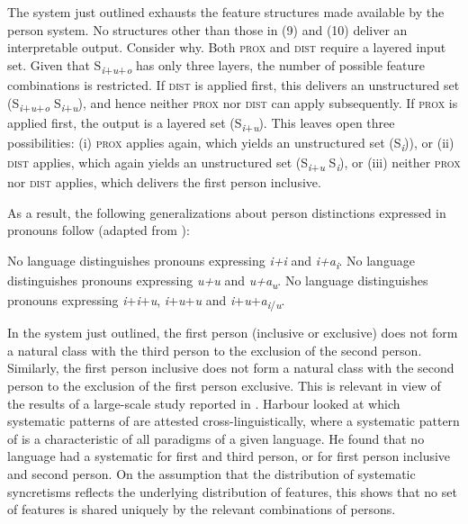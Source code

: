 \documentclass[output=paper]{langsci/langscibook}
\begin{document}
The system just outlined exhausts the feature structures made available by the person system. No structures other than those in (9) and (10) deliver an interpretable output. Consider why. Both \textsc{prox} and \textsc{dist} require a layered input set. Given that S\textit{\textsubscript{i}}\textsubscript{+}\textit{\textsubscript{u}}\textsubscript{+}\textit{\textsubscript{o}} has only three layers, the number of possible feature combinations is restricted. If \textsc{dist} is applied first, this delivers an unstructured set (S\textit{\textsubscript{i}}\textsubscript{+}\textit{\textsubscript{u}}\textsubscript{+}\textit{\textsubscript{o}} \textminus{} S\textit{\textsubscript{i}}\textsubscript{+}\textit{\textsubscript{u}}), and hence neither \textsc{prox} nor \textsc{dist} can apply subsequently. If \textsc{prox} is applied first, the output is a layered set (S\textit{\textsubscript{i}}\textsubscript{+}\textit{\textsubscript{u}}). This leaves open three possibilities: (i) \textsc{prox} applies again, which yields an unstructured set (S\textit{\textsubscript{i}})), or (ii) \textsc{dist} applies, which again yields an unstructured set (S\textit{\textsubscript{i}}\textsubscript{+}\textit{\textsubscript{u}} \textminus{} S\textit{\textsubscript{i}}), or (iii) neither \textsc{prox} nor \textsc{dist} applies, which delivers the first person inclusive.

As a result, the following generalizations about person distinctions expressed in pronouns follow (adapted from \citealt{Bobaljik2008Missing}):

\ea 
    \ea  No language distinguishes pronouns expressing \textit{i+i} and \textit{i+a\textsubscript{i}}.
    \ex No language distinguishes pronouns expressing \textit{u+u} and \textit{u+a\textsubscript{u}}.
    \ex No language distinguishes pronouns expressing \textit{i}+\textit{i}+\textit{u}, \textit{i}+\textit{u}+\textit{u} and \textit{i}+\textit{u}+\textit{a\textsubscript{i}}\textsubscript{/}\textit{\textsubscript{u}}.
    \z
\z



In the system just outlined, the first person (inclusive or exclusive) does not form a natural class with the third person to the exclusion of the second person. Similarly, the first person inclusive does not form a natural class with the second person to the exclusion of the first person exclusive. This is relevant in view of the results of a large-scale study reported in \citet{Harbour2016}. Harbour looked at which systematic patterns of  are attested cross-linguistically, where a systematic pattern of  is a  characteristic of all paradigms of a given language. He found that no language had a systematic  for first and third person, or for first person inclusive and second person. On the assumption that the distribution of systematic syncretisms reflects the underlying distribution of features, this shows that no set of features is shared uniquely by the relevant combinations of persons.
\end{document}
